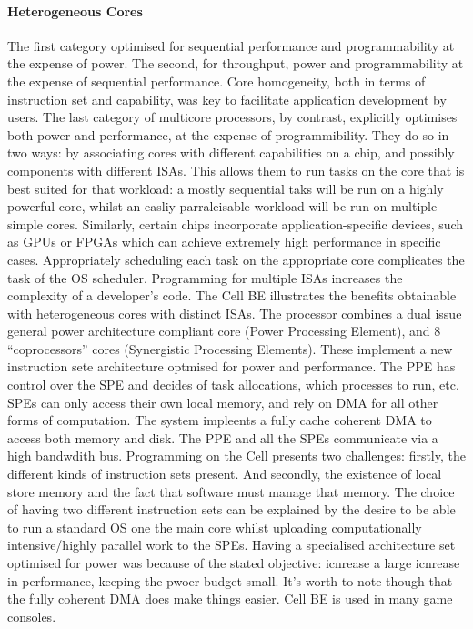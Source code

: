 \paragraph{Heterogeneous Cores} The first category optimised for 
sequential performance and programmability at the expense of power. The second, 
for throughput, power and programmability at the expense of sequential performance. 
Core homogeneity, both in terms of instruction set and capability,
was key to facilitate application development by users. The last category
of multicore processors, by contrast, explicitly optimises both
power and performance, at the expense of programmibility. They do so in two ways: 
by associating cores with different capabilities on a chip, and possibly components
with different ISAs. This allows them to run tasks on the core
that is best suited for that workload: a mostly sequential taks will be run 
on a highly powerful core, whilst an easliy parraleisable workload
will be run on multiple simple cores. Similarly, certain chips incorporate
application-specific devices, such as GPUs or FPGAs which can achieve extremely
high performance in specific cases. Appropriately scheduling each 
task on the appropriate core complicates the task of the OS scheduler.
Programming for multiple ISAs increases the complexity of a developer's code. 
The Cell BE illustrates the benefits obtainable with heterogeneous
cores with distinct ISAs. The processor combines a 
dual issue general power architecture compliant core (Power Processing Element), and 8 ``coprocessors''
cores (Synergistic Processing Elements). These implement a new instruction sete
architecture optmised for power and performance.  The PPE has control over the SPE
and decides of task allocations, which processes to run, etc. SPEs can only 
access their own local memory, and rely on DMA for all other forms of computation.
The system impleents a fully cache coherent DMA to access both memory and disk. 
The PPE and all the SPEs communicate via a high bandwdith bus. 
Programming on the Cell presents two challenges: firstly, the different kinds of 
instruction sets present. And secondly, the existence of local store memory and the
fact that software must manage that memory. The choice of having two different instruction
sets can be explained by the desire to be able to run a standard OS one the main 
core whilst uploading computationally intensive/highly parallel work 
to the SPEs. Having a specialised architecture set optimised for power was
because of the stated objective: icnrease a large icnrease in performance,
keeping the pwoer budget small.  It's worth to note though that the 
fully coherent DMA does make things easier.  Cell BE is used in 
many game consoles.

